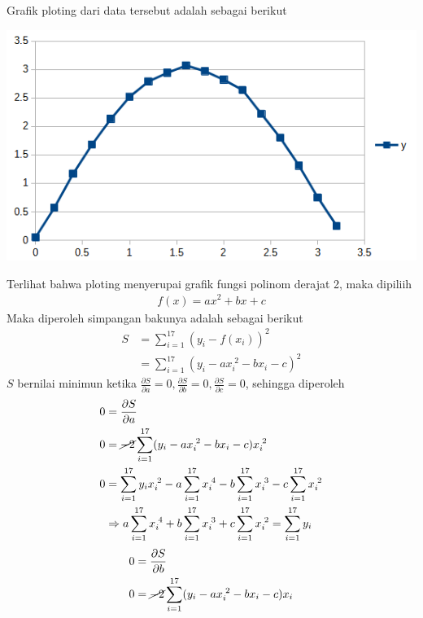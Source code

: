 \documentclass[12pt]{article}
\begin{document}
\begin{enumerate}
{        Grafik ploting dari data tersebut adalah sebagai berikut
        \begin{center}
            \includegraphics[scale=0.6]{grafik_5.png}
        \end{center}
        Terlihat bahwa ploting menyerupai grafik fungsi polinom derajat 2, maka dipiliih
        \begin{align*}
            f(x) = ax^2 + bx + c
        \end{align*}
        Maka diperoleh simpangan bakunya adalah sebagai berikut
        \begin{align*}
            S 
                & = \sum_{i = 1}^{17} (y_i - f(x_i))^2 \\
                & = \sum_{i = 1}^{17} (y_i - ax_i^{\;2} - bx_i - c)^2
        \end{align*}
        $ S $ bernilai minimun ketika $ \frac{\partial S}{\partial a} = 0, \frac{\partial S}{\partial b} = 0, \frac{\partial S}{\partial c} = 0 $, sehingga diperoleh
        \begin{align*}
            0   & = \frac{\partial S}{\partial a}\\
            0   & = \cancel{-2}\sum_{i = 1}^{17}(y_i - ax_i^{\;2} - bx_i - c)x_i^{\;2}\\
            0   & = \sum_{i = 1}^{17}y_ix_i^{\;2} - a\sum_{i = 1}^{17}x_i^{\;4} - b\sum_{i = 1}^{17}x_i^{\;3} - c\sum_{i = 1}^{17}x_i^{\;2} \\
                & \Rightarrow a\sum_{i = 1}^{17}x_i^{\;4} + b\sum_{i = 1}^{17}x_i^{\;3} + c\sum_{i = 1}^{17}x_i^{\;2} = \sum_{i = 1}^{17}y_i
        \end{align*}
        \begin{align*}
            0   & = \frac{\partial S}{\partial b}\\
            0   & = \cancel{-2}\sum_{i = 1}^{17}(y_i - ax_i^{\;2} - bx_i - c)x_i\\

\end{align*}}
\end{enumerate}
\end{document}
